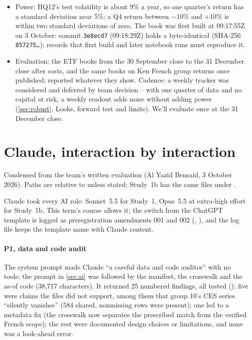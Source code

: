 \begin{itemize}
  \item Power: HQ12's test volatility is about 9\% a year, so one quarter's return has a standard deviation near 5\%; a Q4 return between $-10\%$ and $+10\%$ is within two standard deviations of zero. %
  The book was first built at 09:17:55Z on 3 October: commit \texttt{3e8ecd7} (09:18:29Z) holds a byte-identical  (SHA-256 \texttt{857275\ldots});  records that first build and later notebook runs must reproduce it. %
  \item Evaluation: the ETF books from the 30 September close to the 31 December close after costs, and the same books on Ken French group returns once published; reported whatever they show. Cadence: a weekly tracker was considered and deferred by team decision -- with one quarter of data and no capital at risk, a weekly readout adds noise without adding power (\cref{sec:robust}, Looks, forward test and limits). We'll evaluate once at the 31 December close.
\end{itemize}

\section{Claude, interaction by interaction}\label{app:claude}
Condensed from the team's written evaluation (Al Yazid Bensaid, 3 October 2026). Paths are relative to  unless stated; Study~1b has the same files under .

Claude took every AI role: Sonnet~5.5 for Study~1, Opus~5.5 at extra-high effort for Study~1b. This term's course allows it; the switch from the ChatGPT template is logged as preregistration amendments 001 and 002 (, ), and the log file keeps the template name  with Claude content. %

\paragraph{P1, data and code audit} The system prompt made Claude ``a careful data and code auditor'' with no tools; the prompt in \cref{sec:ai} was followed by the manifest, the crosswalk and the as-of code (38,717 characters). %
It returned 25 numbered findings, all tested (): five were claims the files did not support, among them that group 10's CES series ``silently vanishes'' (584 shared, nonmissing rows were present); one led to a metadata fix (the crosswalk now separates the prescribed match from the verified French scope); the rest were documented design choices or limitations, and none was a look-ahead error. %

